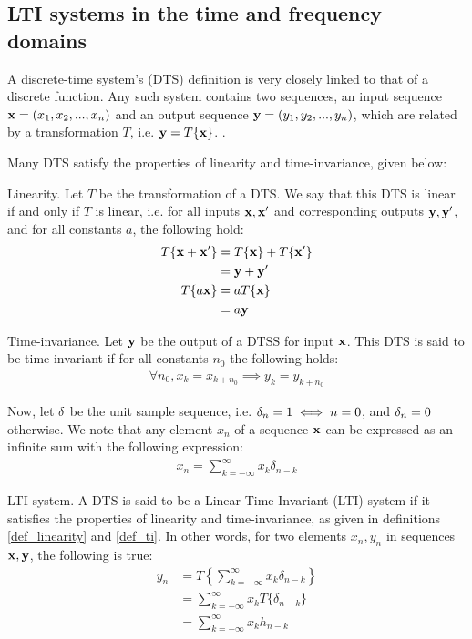 \documentclass[../main.tex]{subfiles}
\begin{document}
\subsection{LTI systems in the time and frequency domains} \label{subsection_lti} 
A discrete-time system's (DTS) definition is very closely linked to that of a discrete function. Any such system contains two sequences, an input sequence $\mathbf{x} = (x_1, x_2, ..., x_n)$ and an output sequence $\mathbf{y} = (y_1, y_2, ..., y_n)$, which are related by a transformation $T$, i.e. $\mathbf{y} = T\{\mathbf{x}\}$.  \cite{Oppenheim2010}. 
\par Many DTS satisfy the properties of linearity and time-invariance, given below:
\begin{definition}{Linearity.} \label{def_linearity}
Let $T$ be the transformation of a DTS. We say that this DTS is linear if and only if $T$ is linear, i.e. for all inputs $\mathbf{x, x}'$ and corresponding outputs $\mathbf{y, y}'$, and for all constants $a$, the following hold:
\begin{align*}
T\{\mathbf{x} + \mathbf{x}'\} &= T\{\mathbf{x}\} + T\{\mathbf{x}'\} \\
&= \mathbf{y} + \mathbf{y}'\\
T\{a\mathbf{x}\} &= aT\{\mathbf{x}\}\\
&= a\mathbf{y}
\end{align*}
\end{definition}
\begin{definition}{Time-invariance.} \label{def_ti}
Let $\mathbf{y}$ be the output of a DTSS for input $\mathbf{x}$. This DTS is said to be time-invariant if for all constants $n_0$ the following holds:
\begin{align*}
\forall n_0, x_k = x_{k+n_0} \implies y_k = y_{k+n_0}
\end{align*}
\end{definition}
\par Now, let $\mathbf{\delta}$ be the unit sample sequence, i.e. $\mathbf{\delta}_n = 1 \iff n = 0$, and $\mathbf{\delta}_n = 0$ otherwise. We note that any element $x_n$ of a sequence $\mathbf{x}$ can be expressed as an infinite sum with the following expression:
\begin{align*}
x_n = \sum_{k=-\infty}^{\infty}x_k\delta_{n-k}
\end{align*}
\begin{definition}{LTI system.} \label{def_lti}
A DTS is said to be a Linear Time-Invariant (LTI) system if it satisfies the properties of linearity and time-invariance, as given in definitions \ref{def_linearity} and \ref{def_ti}. In other words, for two elements $x_n, y_n$ in sequences $\mathbf{x, y}$, the following is true:
\begin{align*}
y_n &= T\left\{\sum_{k=-\infty}^{\infty}x_k\delta_{n-k}\right\}\\
&= \sum_{k=-\infty}^{\infty}x_kT\{\delta_{n-k}\}\\
&= \sum_{k=-\infty}^{\infty}x_kh_{n-k}
\end{align*}
\end{definition} 
\end{document}
